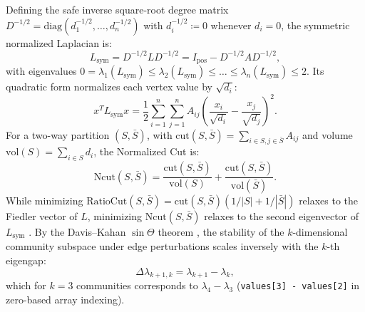 \documentclass[10pt,twocolumn,a4paper]{article}
\begin{document}
Defining the safe inverse square-root degree matrix $D^{-1/2} = \mathrm{diag}(d_1^{-1/2}, \dots, d_n^{-1/2})$ with $d_i^{-1/2} \coloneqq 0$ whenever $d_i = 0$, the symmetric normalized Laplacian is:
\begin{equation}
    L_{\mathrm{sym}} = D^{-1/2} L D^{-1/2} = I_{\mathrm{pos}} - D^{-1/2} A D^{-1/2},
\end{equation}
with eigenvalues $0 = \lambda_1(L_{\mathrm{sym}}) \le \lambda_2(L_{\mathrm{sym}}) \le \dots \le \lambda_n(L_{\mathrm{sym}}) \le 2$. Its quadratic form normalizes each vertex value by $\sqrt{d_i}$:
\begin{equation}
    x^T L_{\mathrm{sym}} x = \frac{1}{2} \sum_{i=1}^n \sum_{j=1}^n A_{ij} \left(\frac{x_i}{\sqrt{d_i}} - \frac{x_j}{\sqrt{d_j}}\right)^2.
\end{equation}
For a two-way partition $(S, \bar{S})$, with $\mathrm{cut}(S, \bar{S}) = \sum_{i \in S, j \in \bar{S}} A_{ij}$ and volume $\mathrm{vol}(S) = \sum_{i \in S} d_i$, the Normalized Cut is:
\begin{equation}
    \mathrm{Ncut}(S, \bar{S}) = \frac{\mathrm{cut}(S, \bar{S})}{\mathrm{vol}(S)} + \frac{\mathrm{cut}(S, \bar{S})}{\mathrm{vol}(\bar{S})}.
\end{equation}
While minimizing $\mathrm{RatioCut}(S, \bar{S}) = \mathrm{cut}(S, \bar{S})(1/|S| + 1/|\bar{S}|)$ relaxes to the Fiedler vector of $L$, minimizing $\mathrm{Ncut}(S, \bar{S})$ relaxes to the second eigenvector of $L_{\mathrm{sym}}$ \cite{shi2000normalized}. By the Davis--Kahan $\sin\Theta$ theorem \cite{yu2015useful}, the stability of the $k$-dimensional community subspace under edge perturbations scales inversely with the $k$-th eigengap:
\begin{equation}
    \Delta\lambda_{k+1, k} = \lambda_{k+1} - \lambda_k,
\end{equation}
which for $k=3$ communities corresponds to $\lambda_4 - \lambda_3$ (\texttt{values[3] - values[2]} in zero-based array indexing).
\end{document}
